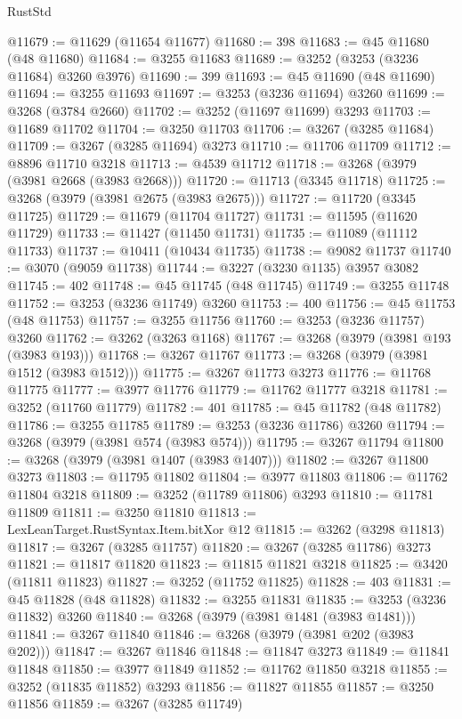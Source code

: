 \begin{lexlean}{RustStd}
\begin{coremodule}
{\begin{coremodule}
{{{{{{{{{{{{{{{{{{{{{{{{{{{{{{{{{{{{{{{@11679 := @11629 (@11654 @11677)
@11680 := 398
@11683 := @45 @11680 (@48 @11680)
@11684 := @3255 @11683
@11689 := @3252 (@3253 (@3236 @11684) @3260 @3976)
@11690 := 399
@11693 := @45 @11690 (@48 @11690)
@11694 := @3255 @11693
@11697 := @3253 (@3236 @11694) @3260
@11699 := @3268 (@3784 @2660)
@11702 := @3252 (@11697 @11699) @3293
@11703 := @11689 @11702
@11704 := @3250 @11703
@11706 := @3267 (@3285 @11684)
@11709 := @3267 (@3285 @11694) @3273
@11710 := @11706 @11709
@11712 := @8896 @11710 @3218
@11713 := @4539 @11712
@11718 := @3268 (@3979 (@3981 @2668 (@3983 @2668)))
@11720 := @11713 (@3345 @11718)
@11725 := @3268 (@3979 (@3981 @2675 (@3983 @2675)))
@11727 := @11720 (@3345 @11725)
@11729 := @11679 (@11704 @11727)
@11731 := @11595 (@11620 @11729)
@11733 := @11427 (@11450 @11731)
@11735 := @11089 (@11112 @11733)
@11737 := @10411 (@10434 @11735)
@11738 := @9082 @11737
@11740 := @3070 (@9059 @11738)
@11744 := @3227 (@3230 @1135) @3957 @3082
@11745 := 402
@11748 := @45 @11745 (@48 @11745)
@11749 := @3255 @11748
@11752 := @3253 (@3236 @11749) @3260
@11753 := 400
@11756 := @45 @11753 (@48 @11753)
@11757 := @3255 @11756
@11760 := @3253 (@3236 @11757) @3260
@11762 := @3262 (@3263 @1168)
@11767 := @3268 (@3979 (@3981 @193 (@3983 @193)))
@11768 := @3267 @11767
@11773 := @3268 (@3979 (@3981 @1512 (@3983 @1512)))
@11775 := @3267 @11773 @3273
@11776 := @11768 @11775
@11777 := @3977 @11776
@11779 := @11762 @11777 @3218
@11781 := @3252 (@11760 @11779)
@11782 := 401
@11785 := @45 @11782 (@48 @11782)
@11786 := @3255 @11785
@11789 := @3253 (@3236 @11786) @3260
@11794 := @3268 (@3979 (@3981 @574 (@3983 @574)))
@11795 := @3267 @11794
@11800 := @3268 (@3979 (@3981 @1407 (@3983 @1407)))
@11802 := @3267 @11800 @3273
@11803 := @11795 @11802
@11804 := @3977 @11803
@11806 := @11762 @11804 @3218
@11809 := @3252 (@11789 @11806) @3293
@11810 := @11781 @11809
@11811 := @3250 @11810
@11813 := LexLeanTarget.RustSyntax.Item.bitXor @12
@11815 := @3262 (@3298 @11813)
@11817 := @3267 (@3285 @11757)
@11820 := @3267 (@3285 @11786) @3273
@11821 := @11817 @11820
@11823 := @11815 @11821 @3218
@11825 := @3420 (@11811 @11823)
@11827 := @3252 (@11752 @11825)
@11828 := 403
@11831 := @45 @11828 (@48 @11828)
@11832 := @3255 @11831
@11835 := @3253 (@3236 @11832) @3260
@11840 := @3268 (@3979 (@3981 @1481 (@3983 @1481)))
@11841 := @3267 @11840
@11846 := @3268 (@3979 (@3981 @202 (@3983 @202)))
@11847 := @3267 @11846
@11848 := @11847 @3273
@11849 := @11841 @11848
@11850 := @3977 @11849
@11852 := @11762 @11850 @3218
@11855 := @3252 (@11835 @11852) @3293
@11856 := @11827 @11855
@11857 := @3250 @11856
@11859 := @3267 (@3285 @11749)
}}}}}}}}}}}}}}}}}}}}}}}}}}}}}}}}}}}}}}}
\end{coremodule}}
\end{coremodule}
\end{lexlean}
